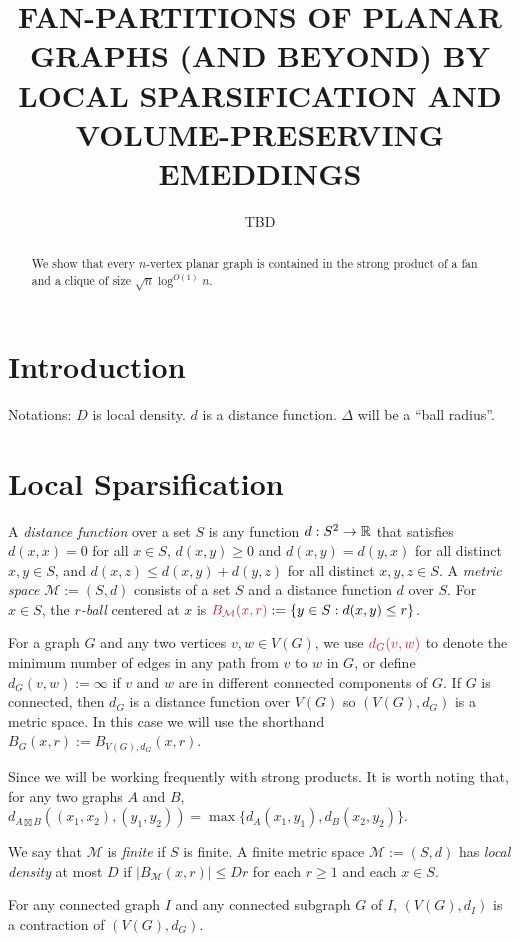 \documentclass{patmorin}
\title{\MakeUppercase{Fan-Partitions of Planar Graphs (and Beyond)
  \newline by Local Sparsification and Volume-Preserving Emeddings}}
\author{TBD}
\date{}
\makeatletter
\newcommand{\defin}[1]{\emph{\textcolor{brightmaroon}{#1}}}
\def\mathcolor#1#{\@mathcolor{#1}}
\def\@mathcolor#1#2#3{%
  \protect\leavevmode
  \begingroup
    \color#1{#2}#3%
  \endgroup
}
\newcommand{\mathdefin}[1]{\mathcolor{brightmaroon}{#1}}
\makeatother
\begin{document}
\maketitle

\begin{abstract}
  We show that every $n$-vertex planar graph is contained in the strong product of a fan and a clique of size $\sqrt{n}\log^{O(1)} n$.
\end{abstract}

\section{Introduction}


Notations: $D$ is local density.  $d$ is a distance function. $\Delta$ will be a ``ball radius''.

\section{Local Sparsification}

A \defin{distance function} over a set $S$ is any function $d:S^2\to\mathbb{R}$ that satisfies $d(x,x)=0$ for all $x\in S$, $d(x,y)\ge 0$ and $d(x,y)=d(y,x)$ for all distinct $x,y\in S$, and $d(x,z) \le d(x,y)+d(y,z)$ for all distinct $x,y,z\in S$.  A \defin{metric space} $\mathcal{M}:=(S,d)$ consists of a set $S$ and a distance function $d$ over $S$.  For $x\in S$, the \defin{$r$-ball} centered at $x$ is $\mathdefin{B_{\mathcal{M}}(x,r)}:=\{y\in S:d(x,y)\le r\}$.

For a graph $G$ and any two vertices $v,w\in V(G)$, we use $\mathdefin{d_G(v,w)}$ to denote the minimum number of edges in any path from $v$ to $w$ in $G$, or define $d_G(v,w):=\infty$ if $v$ and $w$ are in different connected components of $G$.  If $G$ is connected, then $d_G$ is a distance function over $V(G)$ so $(V(G),d_G)$ is a metric space.  In this case we will use the shorthand $B_{G}(x,r):=B_{V(G),d_G}(x,r)$.

Since we will be working frequently with strong products. It is worth noting that, for any two graphs $A$ and $B$, $d_{A\boxtimes B}((x_1,x_2),(y_1,y_2))=\max\{d_A(x_1,y_1),d_B(x_2,y_2)\}$.

We say that $\mathcal{M}$ is \defin{finite} if $S$ is finite.  A finite metric space $\mathcal{M}:=(S,d)$ has \defin{local density} at most $D$ if $|B_\mathcal{M}(x,r)|\le Dr$ for each $r\ge 1$ and each $x\in S$.

\begin{obs}\label{supergraph_contraction}
  For any connected graph $I$ and any connected subgraph $G$ of $I$, $(V(G),d_I)$ is a contraction of $(V(G),d_G)$.
\end{obs}
\end{document}
